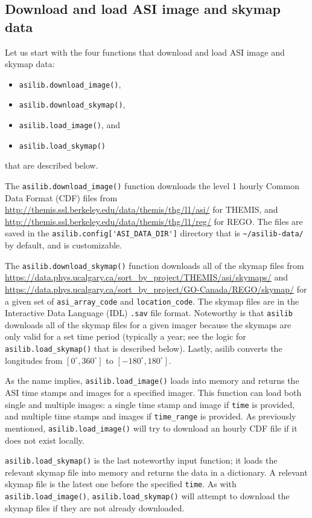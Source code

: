\documentclass[utf8]{FrontiersinHarvard} %
\begin{document}
\subsection{Download and load ASI image and skymap data}
Let us start with the four functions that download and load ASI image and skymap data: 

\begin{itemize}
      \item \verb|asilib.download_image()|,
      \item \verb|asilib.download_skymap()|,
      \item \verb|asilib.load_image()|, and
      \item \verb|asilib.load_skymap()|
\end{itemize} that are described below.

The \verb|asilib.download_image()| function downloads the level 1 hourly Common Data Format (CDF) files from \url{http://themis.ssl.berkeley.edu/data/themis/thg/l1/asi/} for THEMIS, and \url{http://themis.ssl.berkeley.edu/data/themis/thg/l1/reg/} for REGO. The files are saved in the \verb|asilib.config['ASI_DATA_DIR']| directory that is \verb|~/asilib-data/| by default, and is customizable.

The \verb|asilib.download_skymap()| function downloads all of the skymap files from \url{https://data.phys.ucalgary.ca/sort_by_project/THEMIS/asi/skymaps/} and \url{https://data.phys.ucalgary.ca/sort_by_project/GO-Canada/REGO/skymap/} for a given set of \verb|asi_array_code| and \verb|location_code|. The skymap files are in the Interactive Data Language (IDL) \verb|.sav| file format. Noteworthy is that \verb|asilib| downloads all of the skymap files for a given imager because the skymaps are only valid for a set time period (typically a year; see the logic for \verb|asilib.load_skymap()| that is described below). Lastly, asilib converts the longitudes from $[0^\circ, 360^\circ]$ to $[-180^\circ, 180^\circ]$.

As the name implies, \verb|asilib.load_image()| loads into memory and returns the ASI time stamps and images for a specified imager. This function can load both single and multiple images: a single time stamp and image if \verb|time| is provided, and multiple time stamps and images if \verb|time_range| is provided. As previously mentioned, \verb|asilib.load_image()| will try to download an hourly CDF file if it does not exist locally.

\verb|asilib.load_skymap()| is the last noteworthy input function; it loads the relevant skymap file into memory and returns the data in a dictionary. A relevant skymap file is the latest one before the specified \verb|time|. As with \verb|asilib.load_image()|, \verb|asilib.load_skymap()| will attempt to download the skymap files if they are not already downloaded.
\end{document}
